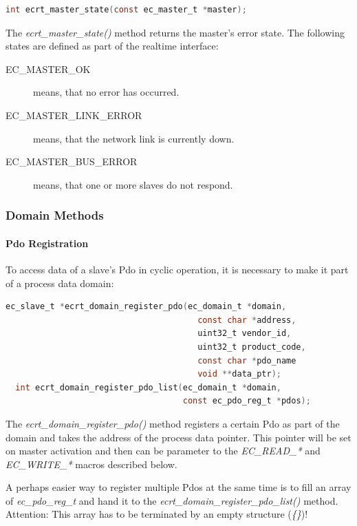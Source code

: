\documentclass[a4paper,12pt,BCOR6mm,bibtotoc,idxtotoc]{scrbook}
\begin{document}
\begin{lstlisting}[gobble=2,language=C]
  int ecrt_master_state(const ec_master_t *master);
\end{lstlisting}

The \textit{ecrt\_master\_state()} method returns the master's error
state. The following states are defined as part of the realtime
interface:

\begin{description}
\item[EC\_MASTER\_OK] means, that no error has occurred.
\item[EC\_MASTER\_LINK\_ERROR] means, that the network link is
  currently down.
\item[EC\_MASTER\_BUS\_ERROR] means, that one or more slaves do not
  respond.
\end{description}

\subsubsection{Domain Methods}
\label{sec:ecrt-domain}

\paragraph{Pdo Registration}

To access data of a slave's Pdo in cyclic operation, it is necessary
to make it part of a process data domain:

\begin{lstlisting}[gobble=2,language=C]
  ec_slave_t *ecrt_domain_register_pdo(ec_domain_t *domain,
                                       const char *address,
                                       uint32_t vendor_id,
                                       uint32_t product_code,
                                       const char *pdo_name
                                       void **data_ptr);
  int ecrt_domain_register_pdo_list(ec_domain_t *domain,
                                    const ec_pdo_reg_t *pdos);
\end{lstlisting}

The \textit{ecrt\_domain\_register\_pdo()} method registers a certain
Pdo as part of the domain and takes the address of the process data
pointer. This pointer will be set on master activation and then can be
parameter to the \textit{EC\_READ\_*} and \textit{EC\_WRITE\_*} macros
described below.

A perhaps easier way to register multiple Pdos at the same time is to
fill an array of \textit{ec\_pdo\_reg\_t} and hand it to the
\textit{ecrt\_domain\_register\_pdo\_list()} method. Attention: This
array has to be terminated by an empty structure (\textit{\{\}})!
\end{document}
